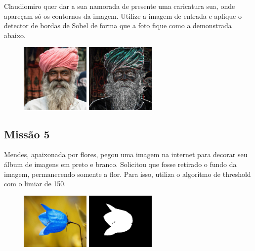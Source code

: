 \documentclass[
	12pt,				%
	oneside,			%
	a4paper,			%
	english,			%
	french,				%
	spanish,			%
	brazil,				%
	]{abntex2}
\begin{document}
\begin{apendicesenv}
Claudiomiro quer dar a sua namorada de presente uma caricatura sua, onde apareçam só os contornos da imagem. Utilize a imagem de entrada e aplique o detector de bordas de Sobel de forma que a foto fique como a demonstrada abaixo.

\begin{figure}[H]
\centering
\includegraphics[width=0.3\textwidth]{imagens/desafioestudio/mission4_input.jpg}
\includegraphics[width=0.3\textwidth]{imagens/desafioestudio/mission4_output.png}
\end{figure}

\subsection{Missão 5}

Mendes, apaixonada por flores, pegou uma imagem na internet para decorar seu álbum de imagens em preto e branco. Solicitou que fosse retirado o fundo da imagem, permanecendo somente a flor. Para isso, utiliza o algoritmo de threshold com o limiar de 150.

\begin{figure}[H]
\centering
\includegraphics[width=0.3\textwidth]{imagens/desafioestudio/mission5_input.jpg}
\includegraphics[width=0.3\textwidth]{imagens/desafioestudio/mission5_output.png}
\end{figure}


\end{apendicesenv}
\end{document}
